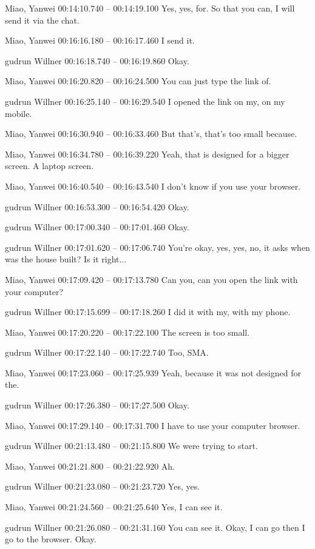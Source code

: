 {Miao, Yanwei 00:14:10.740 -- 00:14:19.100
Yes, yes, for. So that you can, I will send it via the chat.

Miao, Yanwei 00:16:16.180 -- 00:16:17.460
I send it.

gudrun Willner 00:16:18.740 -- 00:16:19.860
Okay.

Miao, Yanwei 00:16:20.820 -- 00:16:24.500
You can just type the link of.

gudrun Willner 00:16:25.140 -- 00:16:29.540
I opened the link on my, on my mobile.

Miao, Yanwei 00:16:30.940 -- 00:16:33.460
But that's, that's too small because.

Miao, Yanwei 00:16:34.780 -- 00:16:39.220
Yeah, that is designed for a bigger screen. A laptop screen.

Miao, Yanwei 00:16:40.540 -- 00:16:43.540
I don't know if you use your browser.

gudrun Willner 00:16:53.300 -- 00:16:54.420
Okay.

gudrun Willner 00:17:00.340 -- 00:17:01.460
Okay.

gudrun Willner 00:17:01.620 -- 00:17:06.740
You're okay, yes, yes, no, it asks when was the house built? Is it right...

Miao, Yanwei 00:17:09.420 -- 00:17:13.780
Can you, can you open the link with your computer?

gudrun Willner 00:17:15.699 -- 00:17:18.260
I did it with my, with my phone.

Miao, Yanwei 00:17:20.220 -- 00:17:22.100
The screen is too small.

gudrun Willner 00:17:22.140 -- 00:17:22.740
Too, SMA.

Miao, Yanwei 00:17:23.060 -- 00:17:25.939
Yeah, because it was not designed for the.

gudrun Willner 00:17:26.380 -- 00:17:27.500
Okay.

Miao, Yanwei 00:17:29.140 -- 00:17:31.700
I have to use your computer browser.

gudrun Willner 00:21:13.480 -- 00:21:15.800
We were trying to start.

Miao, Yanwei 00:21:21.800 -- 00:21:22.920
Ah.

gudrun Willner 00:21:23.080 -- 00:21:23.720
Yes, yes.

Miao, Yanwei 00:21:24.560 -- 00:21:25.640
Yes, I can see it.

gudrun Willner 00:21:26.080 -- 00:21:31.160
You can see it. Okay, I can go then I go to the browser. Okay.

}
